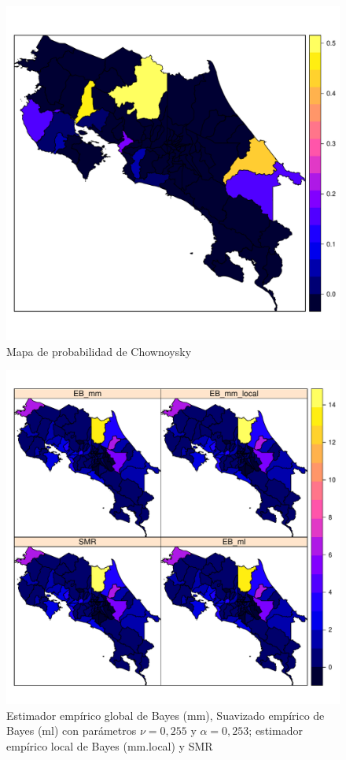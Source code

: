 \documentclass[12pt,a4paper]{article}
\begin{document}
\begin{figure}[hbtp]
\centering
\includegraphics[scale=0.55]{FA9.pdf}
\caption{Mapa de probabilidad de Chownoysky}
\end{figure}
\newpage
\begin{figure}[hbtp]
\centering
\includegraphics[scale=0.75]{FA10.pdf}
\caption{Estimador empírico global de Bayes (mm), Suavizado empírico de Bayes (ml) con parámetros $\nu = 0,255$ y $\alpha = 0,253$; estimador empírico local de Bayes (mm.local) y SMR}
\end{figure}
\newpage



\end{document}
